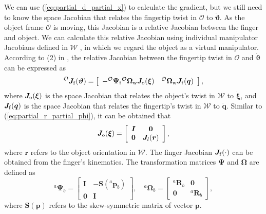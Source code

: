 {We can use (\ref{eq:partial_d_partial_x}) to calculate the gradient, but we still need to know the space Jacobian that relates the fingertip twist in $\mathcal{O}$ to $\dot{\bm \vartheta}$. 
As the object frame $\mathcal{O}$ is moving, this Jacobian is a relative Jacobian between the finger and object. 
We can calculate this relative Jacobian using individual manipulator Jacobians defined in $\mathcal{W}$ \cite{jamisola2015more}, in which we regard the object as a virtual manipulator.
According to (2) in \cite{jamisola2015more}, the relative Jacobian between the fingertip twist in $\mathcal{O}$ and $\dot{\bm \vartheta}$ can be expressed as 
\begin{equation} \label{eq:relative_jacobian}
{^{\mathcal{O}}\bm J_{\rm f}(\bm \vartheta)} =
\left[
\begin{array}{cc}
    - {^{\mathcal{O}}  \bm \Psi_{\rm f}} 
    {^{\mathcal{O}}  \bm \Omega_{\rm w}} 
    \bm J_{\rm o}(\bm \xi)
    & 
    {^{\mathcal{O}}  \bm \Omega_{\rm w}} 
    \bm J_{\rm f}(\bm q)
\end{array}
\right] ,
\end{equation}
where $\bm J_{\rm o}(\bm \xi)$ is the space Jacobian that relates the object's twist in $\mathcal{W}$ to $\dot{\bm \xi}$, and $\bm J_{\rm f}(\bm q)$ is the space Jacobian that relates the fingertip's twist in $\mathcal{W}$ to $\dot{\bm q}$. 
Similar to (\ref{eq:partial_r_partial_phi}), it can be obtained that
\begin{equation}
    \bm J_{\rm o}(\bm \xi) = 
    \left[
    \begin{array}{cc}
      \bm I   &  \bm 0 \\
       \bm 0  &  \bm J_l(\bm r)
    \end{array}
    \right] ,
\end{equation}
where $\bm r$ refers to the object orientation in $\mathcal{W}$. The finger Jacobian $\bm J_{\rm f}(\cdot)$ can be obtained from the finger's kinematics.
The transformation matrices $\bm \Psi$ and $\bm \Omega$ are defined as
\begin{equation}
    {^{a}  \bm \Psi_{b}} = 
    \left[
    \begin{array}{cc}
       \bm I  & -\bm S({^a \bm p_b}) \\
        \bm 0 & \bm I 
    \end{array}
    \right]
    , \quad 
    {^{a}\bm \Omega_{b}} = 
    \left[
    \begin{array}{cc}
       {^{a}\bm R_{b}}  & \bm 0 \\
        \bm 0 & {^{a} \bm R_{b}}
    \end{array}
    \right] ,
\end{equation}
where $\bm S(\bm p)$ refers to the skew-symmetric matrix of vector $\bm p$.

}
